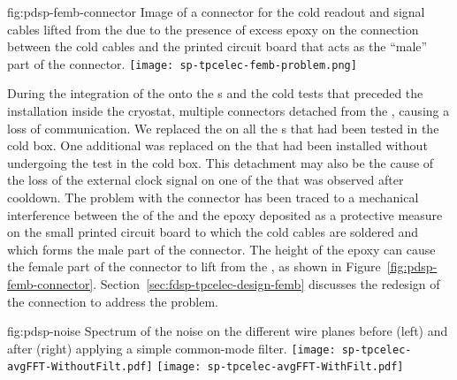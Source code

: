 \begin{dunefigure}
{fig:pdsp-femb-connector}
{Image of a connector for the cold readout and signal cables lifted from
the  due to the presence of excess epoxy on the 
connection between the cold cables and the printed circuit board
that acts as the ``male'' part of the connector.}
\texttt{[image: sp-tpcelec-femb-problem.png]}
\end{dunefigure}

\begin{comment}During the integration of the \dwords{femb} onto the \dword{apa}s 
and the cold tests that preceded the \dwords{apa} installation
inside the \dword{pdsp} cryostat a problem occurred %
on the 
connection between the cold readout and control cables and the
\dwords{femb}. In multiple cases the connector %
detached from
the \dword{femb} causing a loss of communication. 
\end{comment}
During the integration of the  onto the s 
and the cold tests that preceded the  installation
inside the  cryostat,  multiple connectors  
detached from
the , causing a loss of communication.  
We replaced the  %
on all the s that had been tested in the cold box. %
One additional  was 
replaced on the  that had been installed without undergoing 
the test in the cold box. This %
detachment may also be the cause
of the loss of the external clock signal on one of the 
that was observed after cooldown. %
%
The problem 
with the connector has been traced to a mechanical interference between 
the  of the  and the epoxy deposited as a protective measure on the small printed circuit
board to which the cold cables are soldered and which forms the 
male part of the connector. The height of the epoxy can cause 
the female part of the connector to lift from the ,
as shown in 
Figure~\ref{fig:pdsp-femb-connector}. %
Section~\ref{sec:fdsp-tpcelec-design-femb} discusses the redesign of the connection to address the problem.

\begin{dunefigure}
{fig:pdsp-noise}
{Spectrum of the noise on the different   wire planes before
(left) and after (right) applying a simple common-mode filter.}
\texttt{[image: sp-tpcelec-avgFFT-WithoutFilt.pdf]}
\texttt{[image: sp-tpcelec-avgFFT-WithFilt.pdf]}
\end{dunefigure}


